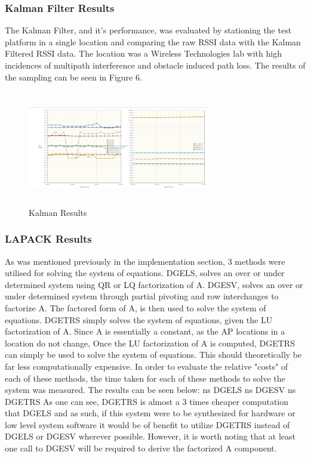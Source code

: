 \documentclass[conference]{IEEEtran}
\begin{document}
\subsubsection{Kalman Filter Results}
The Kalman Filter, and it's performance, was evaluated by stationing the test platform in a single location and comparing the raw RSSI data with the Kalman Filtered RSSI data. The location was a Wireless Technologies lab with high incidences of multipath interference and obstacle induced path loss. The results of the sampling can be seen in Figure 6.
\begin{figure}[H]
    \includegraphics[width=8cm,height=5cm]{2018-05-10-PHOTO-00000079.png}
    \caption{Kalman Results}
    \end{figure}
\subsubsection{LAPACK Results}
As was mentioned previously in the implementation section, 3 methods were utilised for solving the system of equations. DGELS, solves an over or under determined system using QR or LQ factorization of A. DGESV, solves an over or under determined system through  partial pivoting and row interchanges to factorize A. The factored form of A, is then used to solve the system of equations. DGETRS simply solves the system of equations, given the LU factorization of A. Since A is essentially a constant, as the AP locations in a location do not change, Once the LU factorization of A is computed, DGETRS can simply be used to solve the system of equations. This should theoretically be far less computationally expensive. In order to evaluate the relative "costs" of each of these methods, the time taken for each of these methods to solve the system was measured. The results can be seen below: ns DGELS ns DGESV ns DGETRS\newline
As one can see, DGETRS is almost a 3 times cheaper computation that DGELS and as such, if this system were to be synthesized for hardware or low level system software it would be of benefit to utilize DGETRS instead of DGELS or DGESV wherever possible. However, it is worth noting that at least one call to DGESV will be required to derive the factorized A component.
\end{document}
